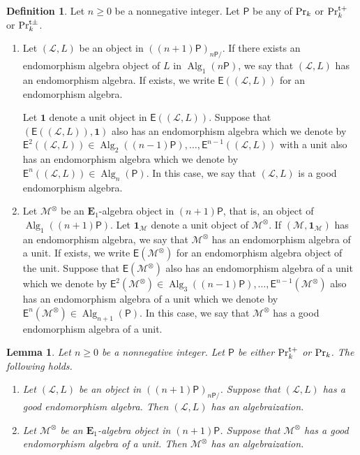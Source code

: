 \documentclass[leqno,12pt]{amsart}
\theoremstyle{plain}
\newtheorem{Lemma}[Theorem]{Lemma}
\theoremstyle{definition}
\newtheorem{Definition}[Theorem]{Definition}
\newcommand{\uni}{\mathbf{1}}
\newcommand{\PR}{\textup{Pr}}
\newcommand{\PRTT}{\textup{Pr}^{\textup{t}+}}
\newcommand{\PRTTT}{\textup{Pr}^{\textup{t}\pm}}
\newcommand{\LLL}{\mathcal{L}}
\newcommand{\MMM}{\mathcal{M}}
\newcommand{\Alg}{\operatorname{Alg}}
\newcommand{\eone}{\mathbf{E}_1}
\begin{document}
\begin{Definition}
\label{goodendomorphism}
Let $n\ge0$ be a nonnegative integer.
Let $\mathsf{P}$ be any of $\PR_k$ or $\PRTT_k$ or $\PRTTT_k$.

\begin{enumerate}
\item
Let $(\LLL,L)$ be an object in $((n+1)\mathsf{P})_{n\mathsf{P}/}$.
If there exists an endomorphism algebra object of $L$ in $\Alg_1(n\mathsf{P})$, 
we say that $(\LLL,L)$ has an endomorphism algebra.
If exists,
we write $\mathsf{E}((\LLL,L))$ for an endomorphism algebra.

Let $\uni$ denote a unit object in $\mathsf{E}((\LLL,L))$.
Suppose that $(\mathsf{E}((\LLL,L)),\uni)$ also has an endomorphism algebra which we denote by $\mathsf{E}^2((\LLL,L))\in \Alg_2((n-1)\mathsf{P}),\ldots,
\mathsf{E}^{n-1}((\LLL,L))$ with a unit also has an endomorphism algebra which we denote by $\mathsf{E}^{n}((\LLL,L))\in \Alg_n(\mathsf{P})$.
In this case, we say that $(\LLL,L)$ is a good endomorphism algebra.

\item
Let $\MMM^\otimes$ be an $\eone$-algebra object in $(n+1)\mathsf{P}$, that is, an object of $\Alg_1((n+1)\mathsf{P})$.
Let $\uni_{\MMM}$ denote a unit object of $\MMM^\otimes$.
If $(\MMM,\uni_{\MMM})$ has an endomorphism algebra, 
we say that $\MMM^\otimes$ has an endomorphism algebra of a unit.
If exists,
we write $\mathsf{E}(\MMM^\otimes)$ for an endomorphism algebra object of the unit.
Suppose that $\mathsf{E}(\MMM^\otimes)$ also has an endomorphism algebra of a unit which we denote by $\mathsf{E}^2(\MMM^\otimes)\in \Alg_3((n-1)\mathsf{P}),\ldots,\mathsf{E}^{n-1}(\MMM^\otimes)$ also has an endomorphism algebra of a unit which we denote by $\mathsf{E}^{n}(\MMM^\otimes)\in \Alg_{n+1}(\mathsf{P})$.
In this case, we say that $\MMM^\otimes$ has a good endomorphism algebra of a unit.

\end{enumerate}
\end{Definition}



\begin{Lemma}
\label{goodalgebraization}
Let $n\ge0$ be a nonnegative integer.
Let $\mathsf{P}$ be either $\PRTT_k$ or $\PR_k$.
The following holds.
\begin{enumerate}
\item
Let $(\LLL,L)$ be an object in $((n+1)\mathsf{P})_{n\mathsf{P}/}$.
Suppose that $(\LLL,L)$ has a good endomorphism algebra.
Then $(\LLL,L)$ has an algebraization.

\item
Let $\MMM^\otimes$ be an $\eone$-algebra object in $(n+1)\mathsf{P}$.
Suppose that $\MMM^\otimes$ has a good endomorphism algebra of a unit.
Then $\MMM^\otimes$ has an algebraization.
\end{enumerate}
\end{Lemma}
\end{document}
